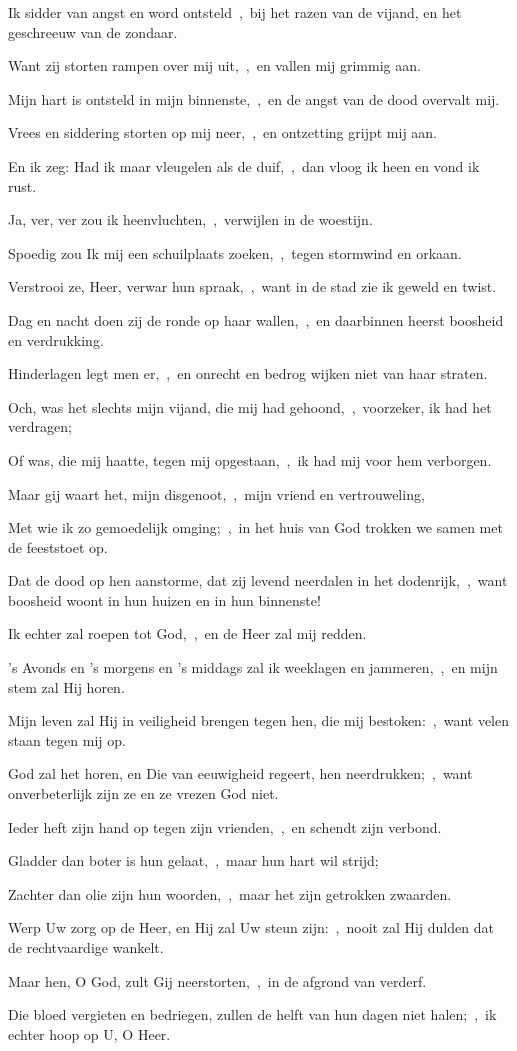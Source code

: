 \documentclass[12pt,twoside,a5paper]{article}
\begin{document}
\begin{halfparskip}
  Ik sidder van angst en word ontsteld~\sep\ bij het razen van de vijand, en het geschreeuw van de zondaar.

  Want zij storten rampen over mij uit,~\sep\ en vallen mij grimmig aan.

  Mijn hart is ontsteld in mijn binnenste,~\sep\ en de angst van de dood overvalt mij.

  Vrees en siddering storten op mij neer,~\sep\ en ontzetting grijpt mij aan.

  En ik zeg: Had ik maar vleugelen als de duif,~\sep\ dan vloog ik heen en vond ik rust.

  Ja, ver, ver zou ik heenvluchten,~\sep\ verwijlen in de woestijn.

  Spoedig zou Ik mij een schuilplaats zoeken,~\sep\ tegen stormwind en orkaan.

  Verstrooi ze, Heer, verwar hun spraak,~\sep\ want in de stad zie ik geweld en twist.

  Dag en nacht doen zij de ronde op haar wallen,~\sep\ en daarbinnen heerst boosheid en verdrukking.

  Hinderlagen legt men er,~\sep\ en onrecht en bedrog wijken niet van haar straten.

  Och, was het slechts mijn vijand, die mij had gehoond,~\sep\ voorzeker, ik had het verdragen;

  Of was, die mij haatte, tegen mij opgestaan,~\sep\ ik had mij voor hem verborgen.

  Maar gij waart het, mijn disgenoot,~\sep\ mijn vriend en vertrouweling,

  Met wie ik zo gemoedelijk omging;~\sep\ in het huis van God trokken we samen met de feeststoet op.

  Dat de dood op hen aanstorme, dat zij levend neerdalen in het dodenrijk,~\sep\ want boosheid woont in hun huizen en in hun binnenste!

  Ik echter zal roepen tot God,~\sep\ en de Heer zal mij redden.

  's Avonds en 's morgens en 's middags zal ik weeklagen en jammeren,~\sep\ en mijn stem zal Hij horen.

  Mijn leven zal Hij in veiligheid brengen tegen hen, die mij bestoken:~\sep\ want velen staan tegen mij op.

  God zal het horen, en Die van eeuwigheid regeert, hen neerdrukken;~\sep\ want onverbeterlijk zijn ze en ze vrezen God niet.

  Ieder heft zijn hand op tegen zijn vrienden,~\sep\ en schendt zijn verbond.

  Gladder dan boter is hun gelaat,~\sep\ maar hun hart wil strijd;

  Zachter dan olie zijn hun woorden,~\sep\ maar het zijn getrokken zwaarden.

  Werp Uw zorg op de Heer, en Hij zal Uw steun zijn:~\sep\ nooit zal Hij dulden dat de rechtvaardige wankelt.

  Maar hen, O God, zult Gij neerstorten,~\sep\ in de afgrond van verderf.

  Die bloed vergieten en bedriegen, zullen de helft van hun dagen niet halen;~\sep\ ik echter hoop op U, O Heer.
\end{halfparskip}
\end{document}
